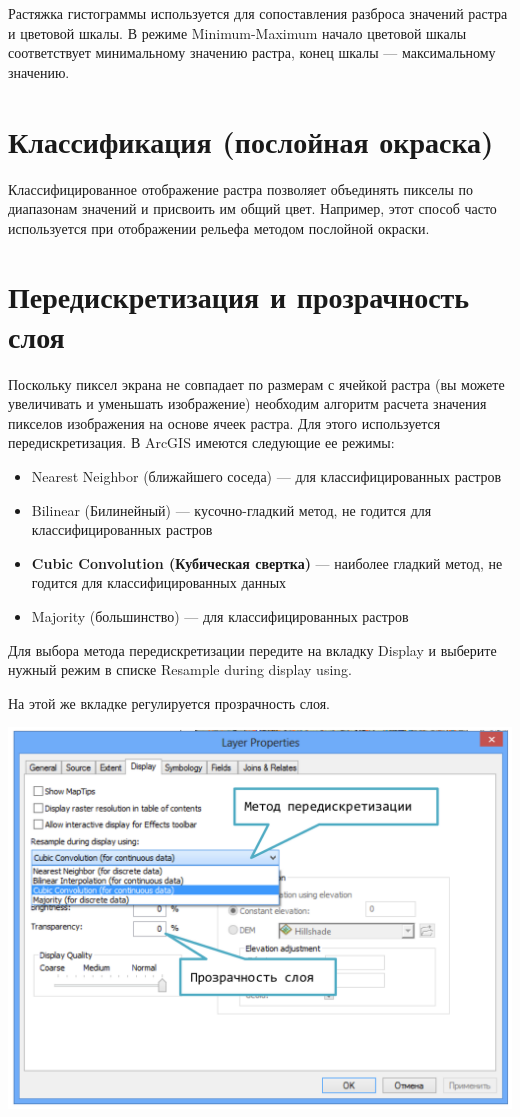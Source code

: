 \documentclass[]{book}
\theoremstyle{definition}
\theoremstyle{definition}
\theoremstyle{definition}
\theoremstyle{remark}
\begin{document}
Растяжка гистограммы используется для сопоставления разброса значений
растра и цветовой шкалы. В режиме Minimum-Maximum начало цветовой шкалы
соответствует минимальному значению растра, конец шкалы ---
максимальному значению.

\hypertarget{--}{%
\section{Классификация (послойная окраска)}\label{--}}

Классифицированное отображение растра позволяет объединять пикселы по
диапазонам значений и присвоить им общий цвет. Например, этот способ
часто используется при отображении рельефа методом послойной окраски.

\hypertarget{---}{%
\section{Передискретизация и прозрачность слоя}\label{---}}

Поскольку пиксел экрана не совпадает по размерам с ячейкой растра (вы
можете увеличивать и уменьшать изображение) необходим алгоритм расчета
значения пикселов изображения на основе ячеек растра. Для этого
используется передискретизация. В ArcGIS имеются следующие ее режимы:

\begin{itemize}
\item
  Nearest Neighbor (ближайшего соседа) --- для классифицированных
  растров
\item
  Bilinear (Билинейный) --- кусочно-гладкий метод, не годится для
  классифицированных растров
\item
  \textbf{Cubic Convolution (Кубическая свертка)} --- наиболее гладкий
  метод, не годится для классифицированных данных
\item
  Majority (большинство) --- для классифицированных растров
\end{itemize}

Для выбора метода передискретизации передите на вкладку Display и
выберите нужный режим в списке Resample during display using.

На этой же вкладке регулируется прозрачность слоя.

\includegraphics{images/Appendix/image38.png}
\end{document}
